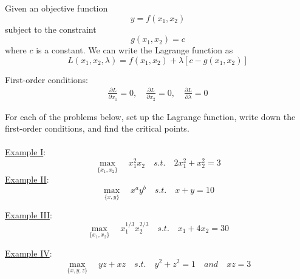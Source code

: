 \documentclass{./../../Latex/handout}
\begin{document}
\thispagestyle{plain}


Given an objective function
$$
y=f(x_1, x_2)
$$
subject to the constraint
$$
g(x_1, x_2)=c
$$
where $c$ is a constant. We can write the Lagrange function as
$$
L(x_1,x_2,\lambda)=f(x_1, x_2)+\lambda[c-g(x_1, x_2)]
$$

First-order conditions:
\begin{align*}
\frac{\partial L}{\partial x_1} = 0, \quad  \frac{\partial L}{\partial x_2} = 0, \quad \frac{\partial L}{\partial \lambda} = 0
\end{align*}

\vspace{2em}
For each of the problems below, set up the Lagrange function, write down the first-order conditions, and find the critical points. \\~\\
\underline{Example I}:\vspace{-1em}
\large $$ \max_{\{x_1,x_2\}} \quad x_1^2x_2 \quad s.t. \quad  2x_1^2 + x_2^2 = 3$$ 
\newpage
\normalsize \underline{Example II}: \vspace{-1em}
\large $$ \max_{\{x,y\}} \quad x^a y^b \quad s.t. \quad x+y=10$$
\vspace{9.5cm}

\normalsize \underline{Example III}:\vspace{-1em}
\large $$ \max_{\{x_1,x_2\}} \quad x_1^{1/3} x_2^{2/3} \quad s.t. \quad x_1 + 4 x_2 = 30 $$

\newpage
\normalsize \underline{Example IV}:\vspace{-1em}
\large $$ \max_{\{x,y,z\}} \quad yz + xz \quad s.t. \quad y^2+z^2=1 \quad and \quad xz=3 $$
\end{document}
